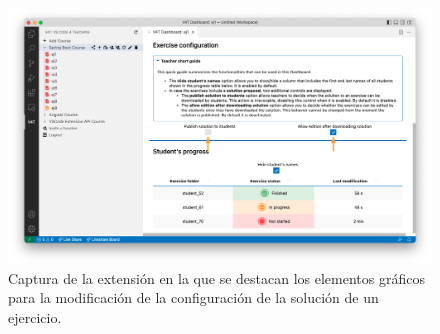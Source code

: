 \begin{figure}[ht]
    \centering
    \includegraphics[width=\textwidth]{imagenes/utilizadas/4-3-implementacion/rf6-1.png}
    \caption{Captura de la extensión en la que se destacan los elementos gráficos para la modificación de la configuración de la solución de un ejercicio.}
    \label{fig:reqf6-1}
\end{figure}
